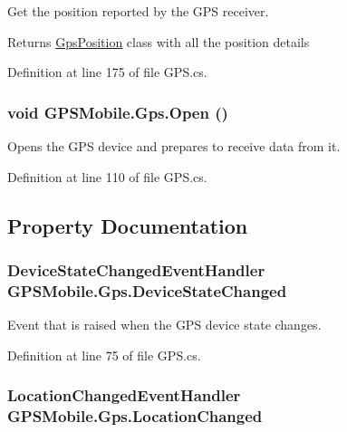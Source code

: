 Get the position reported by the GPS receiver. \begin{DoxyReturn}{Returns}
\hyperlink{class_g_p_s_mobile_1_1_gps_position}{GpsPosition} class with all the position details
\end{DoxyReturn}


Definition at line 175 of file GPS.cs.\hypertarget{class_g_p_s_mobile_1_1_gps_aa8cd40ebf0327a9735912a27113621f2}{
\subsubsection[{Open}]{\setlength{\rightskip}{0pt plus 5cm}void GPSMobile.Gps.Open ()}}
\label{class_g_p_s_mobile_1_1_gps_aa8cd40ebf0327a9735912a27113621f2}


Opens the GPS device and prepares to receive data from it. 

Definition at line 110 of file GPS.cs.

\subsection{Property Documentation}
\hypertarget{class_g_p_s_mobile_1_1_gps_a23f86fff99fbb1192ccab1cc17c3354c}{
\subsubsection[{DeviceStateChanged}]{\setlength{\rightskip}{0pt plus 5cm}DeviceStateChangedEventHandler GPSMobile.Gps.DeviceStateChanged}}
\label{class_g_p_s_mobile_1_1_gps_a23f86fff99fbb1192ccab1cc17c3354c}


Event that is raised when the GPS device state changes. 

Definition at line 75 of file GPS.cs.\hypertarget{class_g_p_s_mobile_1_1_gps_a47e124eef5d1e94dc800878a046540ae}{
\subsubsection[{LocationChanged}]{\setlength{\rightskip}{0pt plus 5cm}LocationChangedEventHandler GPSMobile.Gps.LocationChanged}}
\label{class_g_p_s_mobile_1_1_gps_a47e124eef5d1e94dc800878a046540ae}


